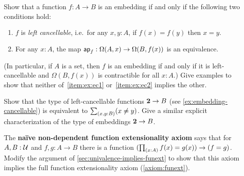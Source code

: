 \begin{ex}\label{ex:embedding-cancellable}
  Show that a function $f:A\to B$ is an embedding if and only if the following two conditions hold:
  \begin{enumerate}
  \item $f$ is \emph{left cancellable}, i.e.\ for any $x,y:A$, if $f(x)=f(y)$ then $x=y$.\label{item:ex:ec1}
  \item For any $x:A$, the map $\mathsf{ap}_{f}: \Omega(A,x) \to \Omega(B,f(x))$ is an equivalence.\label{item:ex:ec2}
  \end{enumerate}
  (In particular, if $A$ is a set, then $f$ is an embedding if and only if it is left-cancellable and $\Omega(B,f(x))$ is contractible for all $x:A$.)
  Give examples to show that neither of~\ref{item:ex:ec1} or~\ref{item:ex:ec2} implies the other.
\end{ex}

\begin{ex}\label{ex:cancellable-from-bool}
  Show that the type of left-cancellable functions $\mathbf{2}\to B$ (see \cref{ex:embedding-cancellable}) is equivalent to $\sm{x,y:B}(x\neq y)$.
  Give a similar explicit characterization of the type of embeddings $\mathbf{2}\to B$.
\end{ex}

\begin{ex}\label{ex:funext-from-nondep}
  The \textbf{na\"{i}ve non-dependent function extensionality axiom} says that for $A,B:\mathcal{U}$ and $f,g:A\to B$ there is a function $(\prd{x:A} f(x)=g(x)) \to (f=g)$.
  Modify the argument of \cref{sec:univalence-implies-funext} to show that this axiom implies the full function extensionality axiom (\cref{axiom:funext}).
\end{ex}

